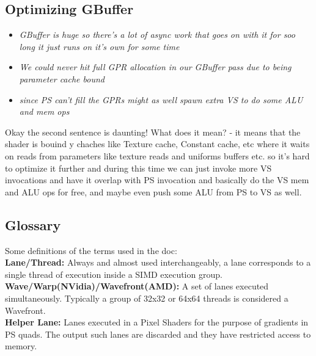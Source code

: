 \documentclass[14pt]{article}
\begin{document}
\subsection*{Optimizing GBuffer}

\begin{itemize}
	\item \textit{GBuffer is huge so there's a lot of async work that goes on with it for soo long it just runs on it's own for some time}
	
	\item \textit{We could never hit full GPR allocation in our GBuffer pass due to being parameter cache bound}
	
	\item \textit{since PS can't fill the GPRs might as well spawn extra VS to do some ALU and mem ops}
\end{itemize}

Okay the second sentence is daunting! What does it mean? - it means that the shader is bouind y chaches like Texture cache, Constant cache,  etc where it waits on reads from parameters like texture reads and uniforms buffers etc. so it's hard to optimize it further and during this time we can just invoke more VS invocations and have it overlap with PS invocation and basically do the VS mem and ALU ops for free, and maybe even push some ALU from PS to VS as well.


\subsection*{Glossary}
Some definitions of the terms used in the doc: \\

\textbf{Lane/Thread:} Always and almost used interchangeably, a lane corresponds to a single thread of execution inside a SIMD execution group.\cite{wave} \\ 

\textbf{Wave/Warp(NVidia)/Wavefront(AMD):} A set of lanes executed simultaneously. Typically a group of 32x32 or 64x64 threads is considered a Wavefront.\cite{wave} \\

\textbf{Helper Lane:} Lanes executed in a Pixel Shaders for the purpose of gradients in PS quads. The output such lanes are discarded and they have restricted access to memory.\cite{wave} \\
\end{document}
